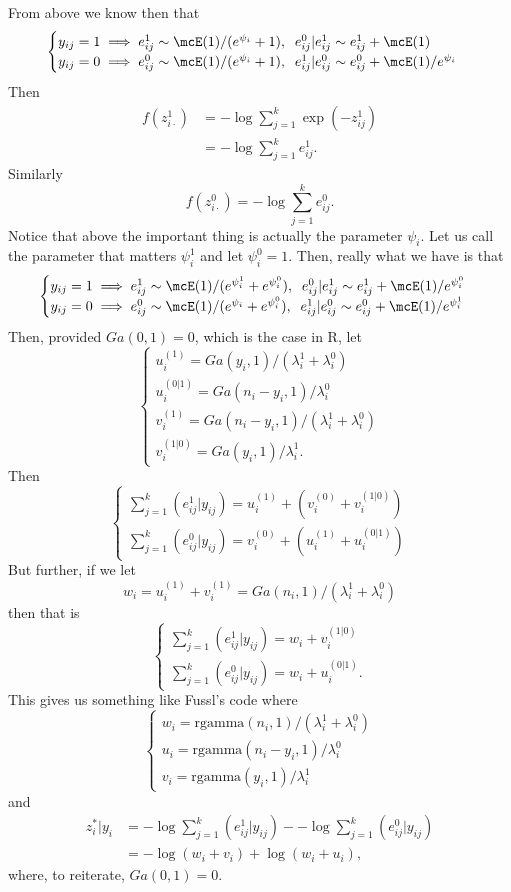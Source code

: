 \documentclass{article}
\begin{document}
From above we know then that
\[
\begin{cases}
y_{ij} = 1 \implies e_{ij}^1 \sim \mcE(1) / (e^{\psi_i} + 1), \; \; 
e_{ij}^0|e_{ij}^1 \sim e_{ij}^1 + \mcE(1) \\
y_{ij} = 0 \implies e_{ij}^0 \sim \mcE(1) / (e^{\psi_i} + 1), \; \; 
e_{ij}^1|e_{ij}^0 \sim e_{ij}^0 + \mcE(1) / e^{\psi_i} \\
\end{cases}
\]
Then
\begin{align*}
f(z_{i\cdot}^1) & = - \log \sum_{j=1}^k \exp(-z_{ij}^1) \\
& = - \log \sum_{j=1}^k e_{ij}^1.
\end{align*}
Similarly
\[
f(z_{i\cdot}^0) = - \log \sum_{j=1}^k e_{ij}^0.
\]
Notice that above the important thing is actually the parameter $\psi_i$.  Let
us call the parameter that matters $\psi_i^1$ and let $\psi_i^0 = 1$.  Then,
really what we have is that
\[
\begin{cases}
y_{ij} = 1 \implies e_{ij}^1 \sim \mcE(1) / (e^{\psi_i^1} + e^{\psi_i^0}), \; \; 
e_{ij}^0|e_{ij}^1 \sim e_{ij}^1 + \mcE(1) / e^{\psi_i^0} \\
y_{ij} = 0 \implies e_{ij}^0 \sim \mcE(1) / (e^{\psi_i} + e^{\psi_i^0}), \; \; 
e_{ij}^1|e_{ij}^0 \sim e_{ij}^0 + \mcE(1) / e^{\psi_i^1} \\
\end{cases}
\]
Then, provided $Ga(0,1) = 0$, which is the case in R, let
\[
\begin{cases}
u_i^{(1)} = Ga(y_i, 1) / (\lambda_i^1 + \lambda_i^0) \\
u_i^{(0|1)} = Ga(n_i - y_i, 1) / \lambda_i^0 \\
v_i^{(1)} = Ga(n_i - y_i, 1) / (\lambda_i^1 + \lambda_i^0) \\
v_i^{(1|0)} = Ga(y_i, 1) / \lambda_i^1.
\end{cases}
\]
Then
\[
\begin{cases}
\sum_{j=1}^k (e_{ij}^1|y_{ij}) = u_i^{(1)} + (v_i^{(0)} + v_i^{(1|0)}) \\
\sum_{j=1}^k (e_{ij}^0|y_{ij}) = v_i^{(0)} + (u_i^{(1)} + u_i^{(0|1)}) 
\end{cases}
\]
But further, if we let
\[
w_i = u_i^{(1)} + v_i^{(1)} = Ga(n_i, 1) / (\lambda_i^1 + \lambda_i^0)
\]
then that is
\[
\begin{cases}
\sum_{j=1}^k (e_{ij}^1|y_{ij}) = w_i + v_i^{(1|0)} \\
\sum_{j=1}^k (e_{ij}^0|y_{ij}) = w_i + u_i^{(0|1)}.
\end{cases}
\]
This gives us something like Fussl's code where
\[
\begin{cases}
w_i = \text{rgamma}(n_i,1) / (\lambda_i^1 + \lambda_i^0) \\
u_i = \text{rgamma}(n_i-y_i, 1) / \lambda_i^0 \\
v_i = \text{rgamma}(y_i, 1) / \lambda_i^1
\end{cases}
\]
and
\begin{align*}
z_i^*|y_i & = - \log \sum_{j=1}^k (e_{ij}^1|y_{ij}) - - \log \sum_{j=1}^k
(e_{ij}^0|y_{ij}) \\
& = - \log(w_i + v_i) + \log(w_i + u_i),
\end{align*}
where, to reiterate, $Ga(0, 1) = 0$.
\end{document}

